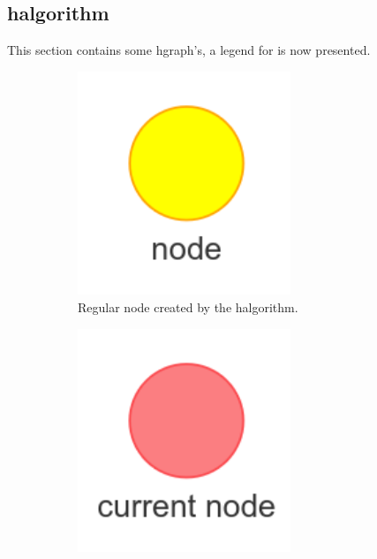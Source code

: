 \subsection{\acl{halgorithm}}%
\label{subsec:halgorithm}
This section contains some \ac{hgraph}'s, a legend for is now presented.

\begin{figure}[H]
    \centering
    \begin{subfigure}{0.2\textwidth}
    \centering
    \includegraphics[width=0.7\textwidth]{figures/connecting_nodes/legend/node}
    \caption{Regular node created by the \ac{halgorithm}.\newline}%
    \end{subfigure}
    \begin{subfigure}{0.2\textwidth}
    \centering
    \includegraphics[width=0.7\textwidth]{figures/connecting_nodes/legend/current_node}

\end{subfigure}
\end{figure}
